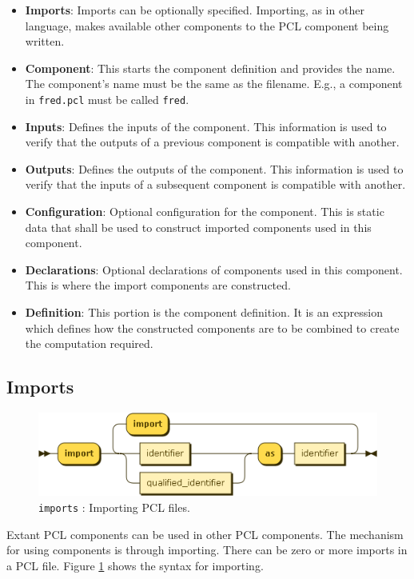 \begin{itemize}
\item \textbf{Imports}: Imports can be optionally specified. Importing, as in other language, makes available other components to the PCL component being written.
\item \textbf{Component}: This starts the component definition and provides the name. The component's name must be the same as the filename. E.g., a component in \texttt{fred.pcl} must be called \texttt{fred}.
\item \textbf{Inputs}: Defines the inputs of the component. This information is used to verify that the outputs of a previous component is compatible with another.
\item \textbf{Outputs}: Defines the outputs of the component. This information is used to verify that the inputs of a subsequent component is compatible with another.
\item \textbf{Configuration}: Optional configuration for the component. This is static data that shall be used to construct imported components used in this component. 
\item \textbf{Declarations}: Optional declarations of components used in this component. This is where the import components are constructed.
\item \textbf{Definition}: This portion is the component definition. It is an expression which defines how the constructed components are to be combined to create the computation required.
\end{itemize}

\subsection{Imports}\label{subsec:imports}
\begin{figure}[h!]
  \centering
    \includegraphics[scale=\DiagramScale]{chapters/compiler/diagrams/imports}
  \caption{\texttt{imports} : Importing PCL files.}
  \label{fig:pcl-imports}
\end{figure}
Extant PCL components can be used in other PCL components. The mechanism for using components is through importing. There can be zero or more imports in a PCL file. Figure \ref{fig:pcl-imports} shows the syntax for importing.


